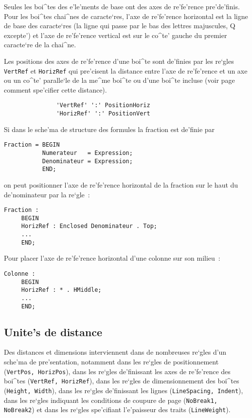 {Seules les boi^tes des e'le'ments de base ont des axes de re'fe'rence pre'de'finis.
Pour les boi^tes chai^nes de caracte`res, l'axe de re'fe'rence horizontal
est la ligne de base des caracte`res (la ligne qui passe par le bas des
lettres majuscules, Q excepte') et l'axe de re'fe'rence vertical est sur
le co^te' gauche du premier caracte`re de la chai^ne.

Les positions des axes de re'fe'rence d'une boi^te sont de'finies par les
re`gles {\tt VertRef} et {\tt HorizRef} qui pre'cisent la distance entre
l'axe de re'fe'rence et un axe ou un co^te' paralle`le de la me^me boi^te ou d'une
boi^te incluse (voir page~\pageref{distance} comment spe'cifier cette
distance).

\begin{verbatim}
               'VertRef' ':' PositionHoriz
               'HorizRef' ':' PositionVert
\end{verbatim}

\begin{example}
Si dans le sche'ma de structure des formules la fraction est
de'finie par

\begin{verbatim}
Fraction = BEGIN
           Numerateur   = Expression;
           Denominateur = Expression;
           END;
\end{verbatim}
on peut positionner l'axe de re'fe'rence horizontal de la fraction sur le haut
du de'nominateur par la re`gle~:

\begin{verbatim}
Fraction :
     BEGIN
     HorizRef : Enclosed Denominateur . Top;
     ...
     END;
\end{verbatim}
Pour placer l'axe de re'fe'rence horizontal d'une colonne sur son milieu~:

\begin{verbatim}
Colonne :
     BEGIN
     HorizRef : * . HMiddle;
     ...
     END;
\end{verbatim}
\end{example}


\subsection{Unite's de distance}
\label{unites}

Des distances et dimensions interviennent dans de nombreuses re`gles d'un
sche'ma de pre'sentation, notamment dans les re`gles  de positionnement
({\tt VertPos, HorizPos}), dans les re`gles de'finissant les axes de re'fe'rence
des boi^tes ({\tt VertRef, HorizRef}), dans les re`gles de dimensionnement des
boi^tes ({\tt Height, Width}), dans les re`gles de'finissant les lignes
({\tt LineSpacing, Indent}), dans les re`gles indiquant les conditions
de coupure de page ({\tt NoBreak1, NoBreak2}) et dans les re`gles
spe'cifiant l'e'paisseur des traits ({\tt LineWeight}).

}
